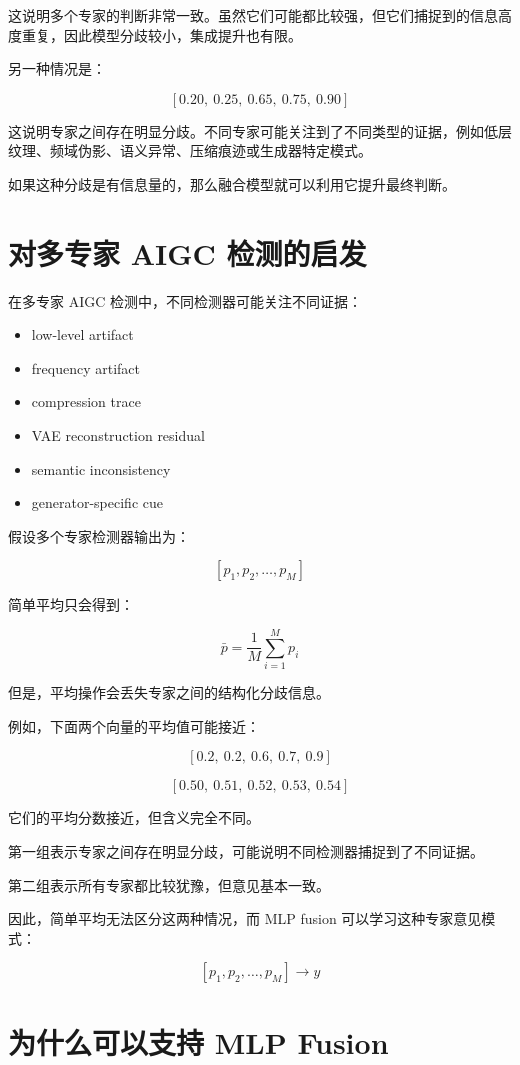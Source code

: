 这说明多个专家的判断非常一致。虽然它们可能都比较强，但它们捕捉到的信息高度重复，因此模型分歧较小，集成提升也有限。

另一种情况是：

\[
[0.20,\ 0.25,\ 0.65,\ 0.75,\ 0.90]
\]

这说明专家之间存在明显分歧。不同专家可能关注到了不同类型的证据，例如低层纹理、频域伪影、语义异常、压缩痕迹或生成器特定模式。

如果这种分歧是有信息量的，那么融合模型就可以利用它提升最终判断。

\section{对多专家 AIGC 检测的启发}

在多专家 AIGC 检测中，不同检测器可能关注不同证据：

\begin{itemize}
  \item low-level artifact
  \item frequency artifact
  \item compression trace
  \item VAE reconstruction residual
  \item semantic inconsistency
  \item generator-specific cue
\end{itemize}

假设多个专家检测器输出为：

\[
[p_1, p_2, \dots, p_M]
\]

简单平均只会得到：

\[
\bar{p} = \frac{1}{M}\sum_{i=1}^{M} p_i
\]

但是，平均操作会丢失专家之间的结构化分歧信息。

例如，下面两个向量的平均值可能接近：

\[
[0.2,\ 0.2,\ 0.6,\ 0.7,\ 0.9]
\]

\[
[0.50,\ 0.51,\ 0.52,\ 0.53,\ 0.54]
\]

它们的平均分数接近，但含义完全不同。

第一组表示专家之间存在明显分歧，可能说明不同检测器捕捉到了不同证据。

第二组表示所有专家都比较犹豫，但意见基本一致。

因此，简单平均无法区分这两种情况，而 MLP fusion 可以学习这种专家意见模式：

\[
[p_1, p_2, \dots, p_M] \rightarrow y
\]

\section{为什么可以支持 MLP Fusion}

